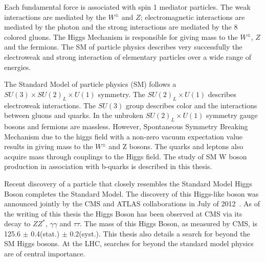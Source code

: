 Each fundamental force is associated with spin 1 mediator particles.
The weak interactions are mediated by the $W^{\pm}$ and $Z$;
electromagnetic interactions are mediated by the photon and the strong interactions
are mediated by the 8 colored gluons. The Higgs Mechanism 
is responsible for giving mass to the $W^{\pm}$, $Z$ and the fermions. 
The SM of particle physics describes very successfully the electroweak and strong
interaction of elementary particles over a wide range of energies.

The Standard Model of particle physics (SM) follows a $SU(3)\times SU(2)_{L}\times U(1)$ %
symmetry. The $SU(2)_{L}\times U(1)$ describes electroweak interactions.
The $SU(3)$ group describes color and the interactions
between gluons and quarks. In the unbroken $SU(2)_{L}\times U(1)$ symmetry
gauge bosons and fermions are massless. 
However, Spontaneous Symmetry Breaking Mechanism due to the higgs
field with a non-zero vacuum expectation value results in giving
mass to the $W^{\pm}$ and Z bosons. The quarks and leptons
also acquire mass through couplings to the Higgs field. 
The study of SM W boson production in association 
with b-quarks is described in this thesis. 

Recent discovery of a particle that closely resembles the Standard Model Higgs Boson
completes the Standard Model.
The discovery of this Higgs-like boson was announced jointly 
by the CMS and ATLAS collaborations in July of 2012~\cite{CMS-HIGGS-DISCOVERY,ATLAS-HIGGS-DISCOVERY}.
As of the writing of this thesis the Higgs Boson has been observed at CMS via
its decay to $ZZ^{*}$, $\gamma\gamma$ and $\tau\tau$. The mass of this
Higgs Boson, as measured by CMS, is 125.6 $\pm$ 0.4(stat.) $\pm$ 0.2(syst.).
This thesis also details a search for beyond the SM Higgs bosons. 
At the LHC, searches for beyond the standard model physics are of central importance.

%

